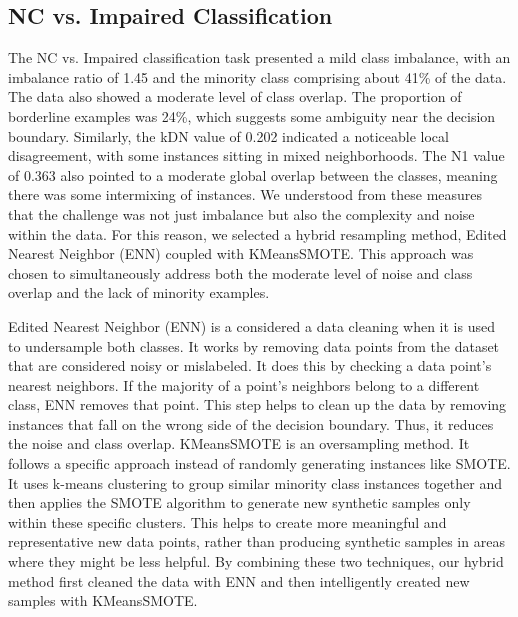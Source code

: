 \subsection{NC vs. Impaired Classification}
The NC vs. Impaired classification task presented a mild class imbalance, with an imbalance ratio of 1.45 and the minority class comprising about 41\% of the data. The data also showed a moderate level of class overlap. The proportion of borderline examples was 24\%, which suggests some ambiguity near the decision boundary. Similarly, the kDN value of 0.202 indicated a noticeable local disagreement, with some instances sitting in mixed neighborhoods. The N1 value of 0.363 also pointed to a moderate global overlap between the classes, meaning there was some intermixing of instances. We understood from these measures that the challenge was not just imbalance but also the complexity and noise within the data. For this reason, we selected a hybrid resampling method, Edited Nearest Neighbor (ENN) coupled with KMeansSMOTE. This approach was chosen to simultaneously address both the moderate level of noise and class overlap and the lack of minority examples.

Edited Nearest Neighbor (ENN) is a considered a data cleaning when it is used to undersample both classes. It works by removing data points from the dataset that are considered noisy or mislabeled. It does this by checking a data point's nearest neighbors. If the majority of a point's neighbors belong to a different class, ENN removes that point. This step helps to clean up the data by removing instances that fall on the wrong side of the decision boundary. Thus, it reduces the noise and class overlap. KMeansSMOTE is an oversampling method. It follows a specific approach instead of randomly generating instances like SMOTE. It uses k-means clustering to group similar minority class instances together and then applies the SMOTE algorithm to generate new synthetic samples only within these specific clusters. This helps to create more meaningful and representative new data points, rather than producing synthetic samples in areas where they might be less helpful. By combining these two techniques, our hybrid method first cleaned the data with ENN and then intelligently created new samples with KMeansSMOTE.

